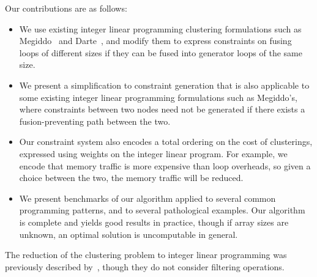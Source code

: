 Our contributions are as follows:

\begin{itemize}
\item   
We use existing integer linear programming clustering formulations such as Megiddo~\cite{megiddo1998optimal} and Darte~\cite{darte2002contraction},
and modify them to express constraints on fusing loops of different sizes if they can be fused into generator loops of the same size.

\item
We present a simplification to constraint generation that is also applicable to some existing integer linear programming formulations such as Megiddo's,
where constraints between two nodes need not be generated if there exists a fusion-preventing path between the two. 

\item
Our constraint system also encodes a total ordering on the cost of clusterings, expressed using weights on the integer linear program.
For example, we encode that memory traffic is more expensive than loop overheads, so given a choice between the two, the memory traffic will be reduced.

\item
We present benchmarks of our algorithm applied to several common programming patterns, and to several pathological examples.
Our algorithm is complete and yields good results in practice, though if array sizes are unknown, an optimal solution is uncomputable in general. 
\end{itemize}

The reduction of the clustering problem to integer linear programming was previously described by~\cite{megiddo1998optimal}, though they do not consider filtering operations.



